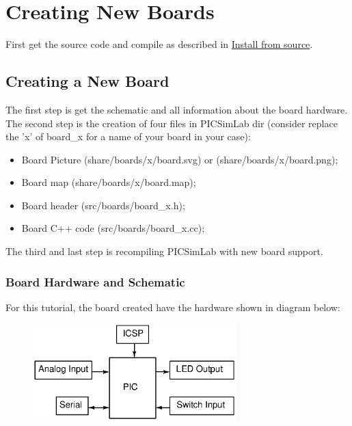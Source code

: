 \chapter{Creating New Boards}

First get the source code and compile as described in \hyperlink{def:isource}{Install from source}.

\section{Creating a New Board}

The first step is get the schematic and all information about the board hardware.
The second step is the creation of four files in PICSimLab dir (consider replace the 'x' of board\_x for a name of your board in your case):
\begin{itemize}
\item Board Picture (share/boards/x/board.svg) or (share/boards/x/board.png);
\item Board map (share/boards/x/board.map);
\item Board header (src/boards/board\_x.h);
\item Board C++ code (src/boards/board\_x.cc);
\end{itemize}

The third and last step is recompiling PICSimLab with new board support.

\subsection{Board Hardware and Schematic}

For this tutorial, the board created have the hardware shown in diagram below:
\begin{figure}[H]
\center
\includegraphics[width=0.7\textwidth]{img/hb/blocks.eps} 
\end{figure} 

